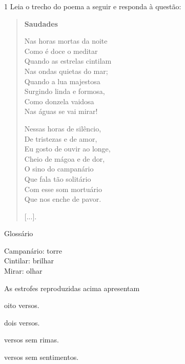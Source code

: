 
\num{1} Leia o trecho do poema a seguir e responda à questão:

\begin{quote}
\textbf{Saudades}

Nas horas mortas da noite\\
Como é doce o meditar\\
Quando as estrelas cintilam\\
Nas ondas quietas do mar;\\
Quando a lua majestosa\\
Surgindo linda e formosa,\\
Como donzela vaidosa\\
Nas águas se vai mirar!

Nessas horas de silêncio,\\
De tristezas e de amor,\\
Eu gosto de ouvir ao longe,\\
Cheio de mágoa e de dor,\\
O sino do campanário\\
Que fala tão solitário\\
Com esse som mortuário\\
Que nos enche de pavor.

{[}...{]}.

\end{quote}

Glossário

Campanário: torre\\
Cintilar: brilhar\\
Mirar: olhar

As estrofes reproduzidas acima apresentam

\begin{escolha}
\item oito versos.

\item dois versos.

\item versos sem rimas.

\item versos sem sentimentos.
\end{escolha}


